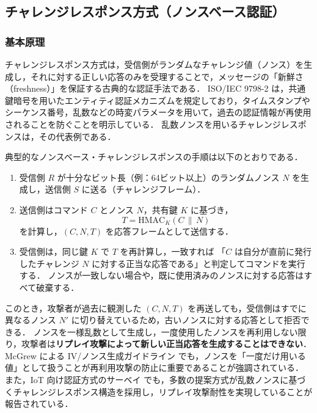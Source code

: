 \documentclass[twocolumn,10pt,a4paper]{jsarticle}
\begin{document}
\subsection{チャレンジレスポンス方式（ノンスベース認証）}

\subsubsection{基本原理}

チャレンジレスポンス方式は，受信側がランダムなチャレンジ値（ノンス）を生成し，それに対する正しい応答のみを受理することで，メッセージの「新鮮さ（freshness）」を保証する古典的な認証手法である．
ISO/IEC 9798-2 は，共通鍵暗号を用いたエンティティ認証メカニズムを規定しており，タイムスタンプやシーケンス番号，乱数などの時変パラメータを用いて，過去の認証情報が再使用されることを防ぐことを明示している\cite{ISO9798-2}．
乱数ノンスを用いるチャレンジレスポンスは，その代表例である．

典型的なノンスベース・チャレンジレスポンスの手順は以下のとおりである．

\begin{enumerate}
  \item 受信側 $R$ が十分なビット長（例：64ビット以上）のランダムノンス $N$ を生成し，送信側 $S$ に送る（チャレンジフレーム）．
  \item 送信側はコマンド $C$ とノンス $N$，共有鍵 $K$ に基づき，
        \[
           T = \mathrm{HMAC}_K(C \,\|\, N)
        \]
        を計算し，$(C, N, T)$ を応答フレームとして送信する．
  \item 受信側は，同じ鍵 $K$ で $T$ を再計算し，一致すれば
        「$C$ は自分が直前に発行したチャレンジ $N$ に対する正当な応答である」と判定してコマンドを実行する．
        ノンスが一致しない場合や，既に使用済みのノンスに対する応答はすべて破棄する．
\end{enumerate}

このとき，攻撃者が過去に観測した $(C, N, T)$ を再送しても，受信側はすでに異なるノンス $N'$ に切り替えているため，古いノンスに対する応答として拒否できる．
ノンスを一様乱数として生成し，一度使用したノンスを再利用しない限り，攻撃者は\textbf{リプレイ攻撃によって新しい正当応答を生成することはできない}．
McGrew による IV/ノンス生成ガイドライン\cite{mcgrew-iv-gen-03} でも，ノンスを「一度だけ用いる値」として扱うことが再利用攻撃の防止に重要であることが強調されている．
また，IoT 向け認証方式のサーベイ\cite{ElHajj2019IoTAuth} でも，多数の提案方式が乱数ノンスに基づくチャレンジレスポンス構造を採用し，リプレイ攻撃耐性を実現していることが報告されている．
\end{document}
